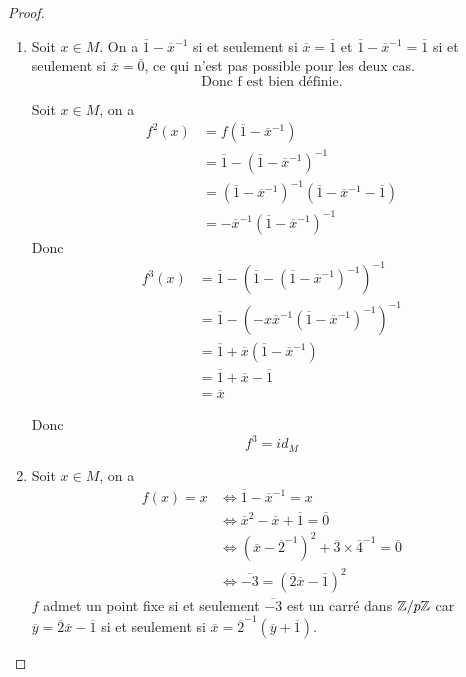\documentclass[12pt]{article}
\begin{document}
\begin{proof}
	\phantom{}
	\begin{enumerate}
		\item Soit $x\in M$. On a $\overline{1}-\overline{x}^{-1}$ si et seulement si $\overline{x}=\overline{1}$ et $\overline{1}-\overline{x}^{-1}=\overline{1}$ si et seulement si $\overline{x}=\overline{0}$, ce qui n'est pas possible pour les deux cas. 
		\begin{equation}
			\boxed{\text{Donc f est bien définie.}}
		\end{equation}
		
		Soit $x\in M$, on a 
		\begin{align}
			f^{2}(x)
			&=f(\overline{1}-\overline{x}^{-1})\\
			&=\overline{1}-(\overline{1}-\overline{x}^{-1})^{-1}\\
			&=(\overline{1}-\overline{x}^{-1})^{-1}(\overline{1}-\overline{x}^{-1}-\overline{1})\\
			&=-\overline{x}^{-1}(\overline{1}-\overline{x}^{-1})^{-1}
		\end{align}
		Donc 
		\begin{align}
			f^{3}(x)
			&=\overline{1}-(\overline{1}-(\overline{1}-\overline{x}^{-1})^{-1})^{-1}\\
			&=\overline{1}-(-x\overline{x}^{-1}(\overline{1}-\overline{x}^{-1})^{-1})^{-1}\\
			&=\overline{1}+\overline{x}(\overline{1}-\overline{x}^{-1})\\
			&=\overline{1}+\overline{x}-\overline{1}\\
			&=\overline{x}
		\end{align}

		Donc
		\begin{equation}
			f^{3}=id_{M}
		\end{equation}

		\item Soit $x\in M$, on a 
		\begin{align}
			f(x)=x
			&\Longleftrightarrow \overline{1}-\overline{x}^{-1}=x\\
			&\Longleftrightarrow \overline{x}^{2}-\overline{x}+\overline{1}=\overline{0}\\
			&\Longleftrightarrow (\overline{x}-\overline{2}^{-1})^{2}+\overline{3}\times\overline{4}^{-1}=\overline{0}\\
			&\Longleftrightarrow \overline{-3}=(\overline{2}\overline{x}-\overline{1})^{2}
		\end{align}
		$f$ admet un point fixe si et seulement $\overline{-3}$ est un carré dans $\mathbb{Z}/p\mathbb{Z}$ car $\overline{y}=\overline{2}\overline{x}-\overline{1}$ si et seulement si $\overline{x}=\overline{2}^{-1}(\overline{y}+\overline{1})$.
		

\end{enumerate}
\end{proof}
\end{document}
